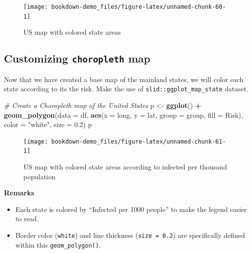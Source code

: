 \documentclass[]{book}
\newenvironment{Shaded}{\begin{snugshade}}{\end{snugshade}}
\newcommand{\KeywordTok}[1]{\textcolor[rgb]{0.13,0.29,0.53}{\textbf{#1}}}
\newcommand{\DataTypeTok}[1]{\textcolor[rgb]{0.13,0.29,0.53}{#1}}
\newcommand{\FloatTok}[1]{\textcolor[rgb]{0.00,0.00,0.81}{#1}}
\newcommand{\StringTok}[1]{\textcolor[rgb]{0.31,0.60,0.02}{#1}}
\newcommand{\CommentTok}[1]{\textcolor[rgb]{0.56,0.35,0.01}{\textit{#1}}}
\newcommand{\OperatorTok}[1]{\textcolor[rgb]{0.81,0.36,0.00}{\textbf{#1}}}
\newcommand{\NormalTok}[1]{#1}
\begin{document}
\begin{figure}

{\centering \texttt{[image: bookdown-demo\_files/figure-latex/unnamed-chunk-60-1]} 

}

\caption{US map with colored state areas}\label{fig:unnamed-chunk-60}
\end{figure}

\subsection{\texorpdfstring{Customizing \texttt{choropleth}
map}{Customizing choropleth map}}\label{customizing-choropleth-map}

Now that we have created a base map of the mainland states, we will
color each state according to its the risk. Make the use of
\texttt{slid::ggplot\_map\_state} dataset.

\begin{Shaded}
\begin{Highlighting}[]
\CommentTok{# Create a Choropleth map of the United States}
\NormalTok{p <-}\StringTok{ }\KeywordTok{ggplot}\NormalTok{() }\OperatorTok{+}\StringTok{ }\KeywordTok{geom_polygon}\NormalTok{(}\DataTypeTok{data =}\NormalTok{ df, }
          \KeywordTok{aes}\NormalTok{(}\DataTypeTok{x =}\NormalTok{ long, }\DataTypeTok{y =}\NormalTok{ lat, }\DataTypeTok{group =}\NormalTok{ group, }
              \DataTypeTok{fill =}\NormalTok{ Risk), }
          \DataTypeTok{color =} \StringTok{"white"}\NormalTok{, }\DataTypeTok{size =} \FloatTok{0.2}\NormalTok{) }
\NormalTok{p}
\end{Highlighting}
\end{Shaded}

\begin{figure}

{\centering \texttt{[image: bookdown-demo\_files/figure-latex/unnamed-chunk-61-1]} 

}

\caption{US map with colored state areas according to infected per thousand population}\label{fig:unnamed-chunk-61}
\end{figure}

\textbf{Remarks}

\begin{itemize}
\item
  Each state is colored by ``Infected per 1000 people'' to make the
  legend easier to read.
\item
  Border color (\texttt{white}) and line thickness
  (\texttt{size\ =\ 0.2}) are specifically defined within this
  \texttt{geom\_polygon()}.
\end{itemize}
\end{document}
